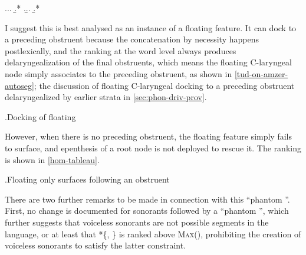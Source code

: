 \ex.\label{ex:h-phantom-h}\a.\a.
\b.*
\z.\b.\a.
\b.*

I suggest this is best analysed as an instance of a floating  feature. It can dock to a preceding obstruent because the concatenation by necessity happens postlexically, and the ranking at the word level always produces delaryngealization of the final obstruents, which means the floating C-laryngeal node simply associates to the preceding obstruent, as shown in \ref{tud-on-amzer-autoseg}; \cf the discussion of floating C-laryngeal docking to a preceding obstruent delaryngealized by earlier strata in \cref{sec:phon-driv-prov}.

\ex.\label{tud-on-amzer-autoseg}Docking of floating \\

However, when there is no preceding obstruent, the floating feature simply fails to surface, and epenthesis of a root node is not deployed to rescue it. The ranking is shown in \ref{hom-tableau}.

\ex.\label{hom-tableau}Floating  only surfaces following an obstruent\\

There are two further remarks to be made in connection with this \enquote{phantom \ipa{[h]}}. First, no change is documented for sonorants followed by a \enquote{phantom \ipa{[h]}}, which further suggests that voiceless sonorants are not possible segments in the language, or at least that *\{, \} is ranked above \textsc{Max}(), prohibiting the creation of voiceless sonorants to satisfy the latter constraint.

